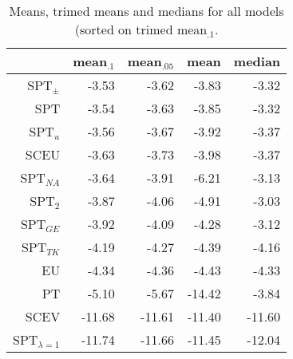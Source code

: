 \documentclass[a4paper]{article}\usepackage[]{graphicx}\usepackage[]{color}
\begin{document}
\begin{table}[!htb]
\centering
\begin{tabular}{rrrrr}
  \hline
 & mean$_{.1}$ & mean$_{.05}$ & mean & median \\ 
  \hline
SPT$_{\pm}$ & -3.53 & -3.62 & -3.83 & -3.32 \\ 
  SPT & -3.54 & -3.63 & -3.85 & -3.32 \\ 
  SPT$_{u}$ & -3.56 & -3.67 & -3.92 & -3.37 \\ 
  SCEU & -3.63 & -3.73 & -3.98 & -3.37 \\ 
  SPT$_{NA}$ & -3.64 & -3.91 & -6.21 & -3.13 \\ 
  SPT$_{2}$ & -3.87 & -4.06 & -4.91 & -3.03 \\ 
  SPT$_{GE}$ & -3.92 & -4.09 & -4.28 & -3.12 \\ 
  SPT$_{TK}$ & -4.19 & -4.27 & -4.39 & -4.16 \\ 
  EU & -4.34 & -4.36 & -4.43 & -4.33 \\ 
  PT & -5.10 & -5.67 & -14.42 & -3.84 \\ 
  SCEV & -11.68 & -11.61 & -11.40 & -11.60 \\ 
  SPT$_{\lambda = 1}$ & -11.74 & -11.66 & -11.45 & -12.04 \\ 
   \hline
\end{tabular}
\caption{Means, trimed means and medians for all models (sorted on trimed mean$_{.1}$.} 
\label{table_means_PT_models}
\end{table}
\end{document}
